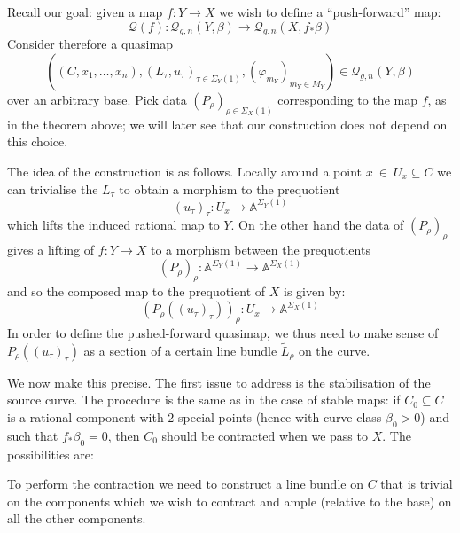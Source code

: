 \documentclass[11pt]{amsart}
\newcommand{\Q}[4]{\mathcal{Q}_{#1,#2}(#3,#4)}
\renewcommand{\to}{\rightarrow}
\newcommand{\Aaff}{\mathbb{A}}
\newcommand{\om}[1]{\mathcal{#1}}
\theoremstyle{definition}
\theoremstyle{definition}
\begin{document}
Recall our goal: given a map $f \colon Y \to X$ we wish to define a ``push-forward'' map:
\begin{equation*} \om{Q}(f) : \Q{g}{n}{Y}{\beta} \to \Q{g}{n}{X}{f_*\beta} \end{equation*}
Consider therefore a quasimap
\begin{equation*} ((C,x_1,\ldots,x_n), (L_\tau, u_\tau)_{\tau \in \Sigma_Y(1)}, (\varphi_{m_Y})_{m_Y \in M_Y}) \in \Q{g}{n}{Y}{\beta} \end{equation*}
over an arbitrary base. Pick data $(P_\rho)_{\rho \in \Sigma_X(1)}$ corresponding to the map $f$, as in the theorem above; we will later see that our construction does not depend on this choice.

The idea of the construction is as follows. Locally around a point $x~\in~U_x \subseteq C$ we can trivialise the $L_\tau$ to obtain a morphism to the prequotient
\begin{equation*} (u_\tau)_\tau \colon U_x \to \Aaff^{\Sigma_Y(1)} \end{equation*}
which lifts the induced rational map to $Y$. On the other hand the data of $(P_\rho)_\rho$ gives a lifting of $f\colon Y\to X$ to a morphism between the prequotients
\begin{equation*}(P_\rho)_\rho \colon \Aaff^{\Sigma_Y(1)} \to \Aaff^{\Sigma_X(1)}\end{equation*}
and so the composed map to the prequotient of $X$ is given by:
\begin{equation*} (P_\rho((u_\tau)_\tau))_\rho : U_x \to \Aaff^{\Sigma_X(1)} \end{equation*}
In order to define the pushed-forward quasimap, we thus need to make sense of $P_\rho((u_\tau)_\tau)$ as a section of a certain line bundle $\tilde{L}_\rho$ on the curve.

We now make this precise. The first issue to address is the stabilisation of the source curve. The procedure is the same as in the case of stable maps: if $C_0 \subseteq C$ is a rational component with $2$ special points (hence with curve class $\beta_0 > 0$) and such that $f_* \beta_0 = 0$, then $C_0$ should be contracted when we pass to $X$. The possibilities are:

\begin{center}
\end{center}
To perform the contraction we need to construct a line bundle on $C$ that is trivial on the components which we wish to contract and ample (relative to the base) on all the other components.
\end{document}
